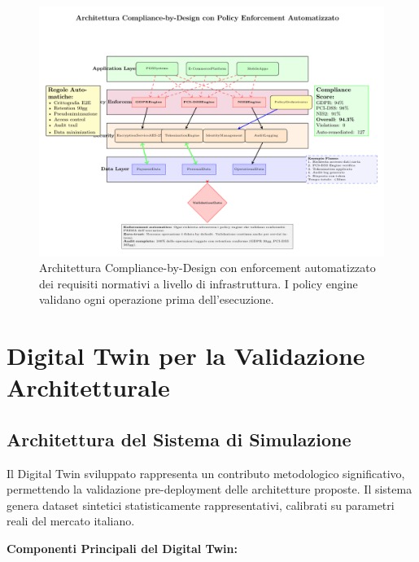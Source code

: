 \begin{figure}[htbp]
\centering
\includegraphics[width=\textwidth]{thesis_figures/cap3/compliance_by_design.pdf}
\caption{Architettura Compliance-by-Design con enforcement automatizzato dei requisiti normativi a livello di infrastruttura. I policy engine validano ogni operazione prima dell'esecuzione.}
\label{fig:compliance_pattern}
\end{figure}

\section{\texorpdfstring{Digital Twin per la Validazione Architetturale}{3.4 - Digital Twin per la Validazione Architetturale}}

\subsection{\texorpdfstring{Architettura del Sistema di Simulazione}{3.4.1 - Architettura del Sistema di Simulazione}}

Il Digital Twin sviluppato rappresenta un contributo metodologico significativo, permettendo la validazione pre-deployment delle architetture proposte. Il sistema genera dataset sintetici statisticamente rappresentativi, calibrati su parametri reali del mercato italiano.

\textbf{Componenti Principali del Digital Twin:}

